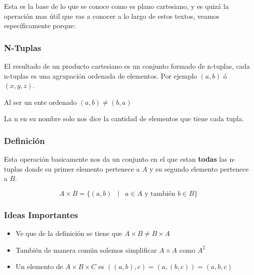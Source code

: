 \documentclass[12pt]{report}                                    %
\DeclareMathOperator \Space {\quad}                             %
\DeclareMathOperator \MiniSpace {\;}                            %
\newcommand \Such {\MiniSpace|\MiniSpace}                       %
\begin{document}
                Esta es la base de lo que se conoce como es plano cartesiano, y es quizá
                la operación mas útil que vas a conocer a lo largo de estos textos,
                veamos específicamente porque:

                \subsubsection*{N-Tuplas}

                    El resultado de un producto cartesiano es un conjunto formado de n-tuplas,
                    cada n-tuplas es una agrupación ordenada de elementos.
                    Por ejemplo $(a,b)$ ó $(x,y,z)$.

                    Al ser un ente ordenado $(a,b) \neq (b,a)$

                    La n en su nombre solo nos dice la cantidad de elementos que tiene cada tupla.


                \subsubsection*{Definición}

                    Esta operación basicamente nos da un conjunto en el que estan \textbf{todas} las n-tuplas
                    donde su primer elemento pertenece a $A$ y su segundo elemento pertenece a $B$.

                    \begin{equation}
                        A \times B = \{ (a, b) \Such a \in A \text{ y también } b \in B \}
                    \end{equation}

                \subsubsection*{Ideas Importantes}

                \begin{itemize}
                    \item Ve que de la definición se tiene que $ A \times B \neq B \times A$

                    \item También de manera común solemos simplificar $A \times A$ como $A^2$

                    \item Un elemento de $A \times B \times C$ es $((a,b),c) = (a,(b,c)) = (a,b,c)$
                \end{itemize}
\end{document}
